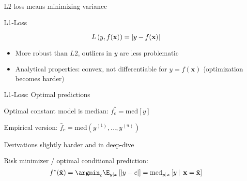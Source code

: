 \documentclass[11pt,compress,t,notes=noshow, xcolor=table]{beamer}
\begin{document}
\begin{frame}{L2 loss means minimizing variance}

  \vfill


\end{frame}

\begin{frame}{L1-Loss}

$$
L\left(y, f(\mathbf{x})\right) = \left|y-f(\mathbf{x})\right|
$$

\begin{itemize}
\item More robust than $L2$, outliers in $y$ are less problematic
\item Analytical properties: convex, not differentiable for $y = f(\bm{x})$ (optimization becomes harder)
\end{itemize}

\vfill


\end{frame}


\begin{framei}[sep=L]{L1-Loss: Optimal predictions}

\item Optimal constant model is median: 
$f_{c}^{\ast} = \text{med} [y]$

\item Empirical version: $\hat{f}_c = \text{med}(y^{(1)}, \ldots, y^{(n)}) $  

\item Derivations slightly harder and in deep-dive

\item Risk minimizer / optimal conditional prediction:
$$f^{\ast}(\xtil) = \argmin_c \E_{y|x}\left[|y - c|\right]= \text{med}_{y|x} \left[y ~|~ \xv = \xtil \right]
$$

\end{framei}



\endlecture
\end{document}
